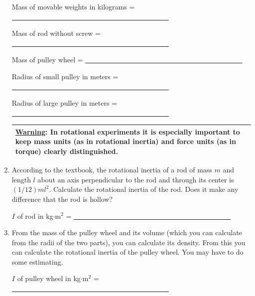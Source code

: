 \begin{enumerate}[label=\arabic*.]
Mass of movable weights in kilograms = \ul{~~~~~~~~~~~~~~~~~~~~~~~~~~~~~~~~~~~~~~~~~~~~~}

Mass of rod without screw = \ul{~~~~~~~~~~~~~~~~~~~~~~~~~~~~~~~~~~~~~~~~~~~~~}

Mass of pulley wheel = \ul{~~~~~~~~~~~~~~~~~~~~~~~~~~~~~~~~~~~~~~~~~~~~~}

Radius of small pulley in meters = \ul{~~~~~~~~~~~~~~~~~~~~~~~~~~~~~~~~~~~~~~~~~~~~~}

Radius of large pulley in meters = \ul{~~~~~~~~~~~~~~~~~~~~~~~~~~~~~~~~~~~~~~~~~~~~~}

\begin{center}
\begin{tabular}{|p{14cm}|}
\hline\tstrut
\ul{Warning}: In rotational experiments it is especially important to keep mass units (as in rotational inertia) and force units (as in torque) clearly distinguished.  \bstrut\\
\hline
\end{tabular}
\end{center}

\item According to the textbook, the rotational inertia of a rod of mass \(m\) and length \(l\) about an axis perpendicular to the rod and through its center is \((1/12)ml^2\).  Calculate the rotational inertia of the rod.  Does it make any difference that the rod is hollow?

\(I\) of rod in kg\(\cdot\)m\(^{2}\) = \ul{~~~~~~~~~~~~~~~~~~~~~~~~~~~~~~~~~~~~~~~~~~~~~}

\item From the mass of the pulley wheel and its volume (which you can calculate from the radii of the two parts), you can calculate its density.  From this you can calculate the rotational inertia of the pulley wheel.  You may have to do some estimating.

\(I\) of pulley wheel in kg\(\cdot\)m\(^{2}\) = \ul{~~~~~~~~~~~~~~~~~~~~~~~~~~~~~~~~~~~~~~~~~~~~~}


\end{enumerate}
